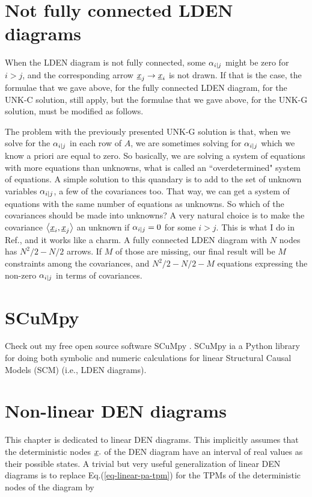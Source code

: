 \section{Not fully connected LDEN diagrams}

When the LDEN diagram is not
fully connected, some $\alpha_{i|j}$
might be zero for $i>j$, and the
corresponding arrow ${\underline{x}}_j\rightarrow{\underline{x}}_i$
is not drawn. If that is the case,
the formulae that we gave above,
for the fully connected LDEN diagram,
for the UNK-C solution, still apply,
but the formulae that we gave above, for the UNK-G solution,
must be modified as follows.

The problem with the previously
presented UNK-G solution is that,
when we solve for the $\alpha_{i|j}$
in each row of $A$,
we are sometimes solving for $\alpha_{i|j}$
which we know a priori are equal to zero.
So basically, we are solving a system of equations with more equations than unknowns,
what is called an ``overdetermined" system
of equations. A simple solution
to this quandary is to add to the set
of unknown variables $\alpha_{i|j}$,
a few of the covariances too.
That way, we can get a system
of equations with the same number of
equations as unknowns.
So which of the covariances
should be made into unknowns?
A very natural choice
is to make the covariance $\left\langle{\underline{x}}_i, {\underline{x}}_j\right\rangle$
an unknown if $\alpha_{i|j}=0$
for some $i>j$.
This is what I do in Ref.\cite{scumpy},
and it works like a charm.
A fully connected LDEN diagram with $N$ nodes
has $N^2/2-N/2$ arrows. If $M$ of those are 
missing, our final result 
will be $M$ constraints among the 
covariances, and $N^2/2-N/2 - M$
equations expressing the non-zero $\alpha_{i|j}$
in terms of covariances.


 



\section{SCuMpy}
Check out my free open source
software SCuMpy \cite{scumpy}.
SCuMpy ia a Python library for doing both symbolic and numeric calculations for linear Structural Causal Models (SCM) (i.e., LDEN diagrams).


\section{Non-linear DEN diagrams}
This chapter 
is dedicated to
linear DEN diagrams. This
implicitly
assumes that 
the deterministic
nodes ${\underline{x}}.$
of the 
DEN diagram have
an interval of
real values as their
possible states.
A trivial
but very useful
generalization
of linear DEN diagrams is to
replace Eq.(\ref{eq-linear-pa-tpm})
for the TPMs
of the
deterministic nodes
of the diagram by

